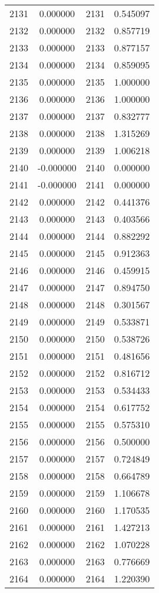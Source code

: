 \documentclass[12pt]{article}
\begin{document}
\begin{longtable}{@{}cccc@{}}
2131 & 0.000000 & 2131 & 0.545097 \\
2132 & 0.000000 & 2132 & 0.857719 \\
2133 & 0.000000 & 2133 & 0.877157 \\
2134 & 0.000000 & 2134 & 0.859095 \\
2135 & 0.000000 & 2135 & 1.000000 \\
2136 & 0.000000 & 2136 & 1.000000 \\
2137 & 0.000000 & 2137 & 0.832777 \\
2138 & 0.000000 & 2138 & 1.315269 \\
2139 & 0.000000 & 2139 & 1.006218 \\
2140 & -0.000000 & 2140 & 0.000000 \\
2141 & -0.000000 & 2141 & 0.000000 \\
2142 & 0.000000 & 2142 & 0.441376 \\
2143 & 0.000000 & 2143 & 0.403566 \\
2144 & 0.000000 & 2144 & 0.882292 \\
2145 & 0.000000 & 2145 & 0.912363 \\
2146 & 0.000000 & 2146 & 0.459915 \\
2147 & 0.000000 & 2147 & 0.894750 \\
2148 & 0.000000 & 2148 & 0.301567 \\
2149 & 0.000000 & 2149 & 0.533871 \\
2150 & 0.000000 & 2150 & 0.538726 \\
2151 & 0.000000 & 2151 & 0.481656 \\
2152 & 0.000000 & 2152 & 0.816712 \\
2153 & 0.000000 & 2153 & 0.534433 \\
2154 & 0.000000 & 2154 & 0.617752 \\
2155 & 0.000000 & 2155 & 0.575310 \\
2156 & 0.000000 & 2156 & 0.500000 \\
2157 & 0.000000 & 2157 & 0.724849 \\
2158 & 0.000000 & 2158 & 0.664789 \\
2159 & 0.000000 & 2159 & 1.106678 \\
2160 & 0.000000 & 2160 & 1.170535 \\
2161 & 0.000000 & 2161 & 1.427213 \\
2162 & 0.000000 & 2162 & 1.070228 \\
2163 & 0.000000 & 2163 & 0.776669 \\
2164 & 0.000000 & 2164 & 1.220390 \\

\end{longtable}
\end{document}
